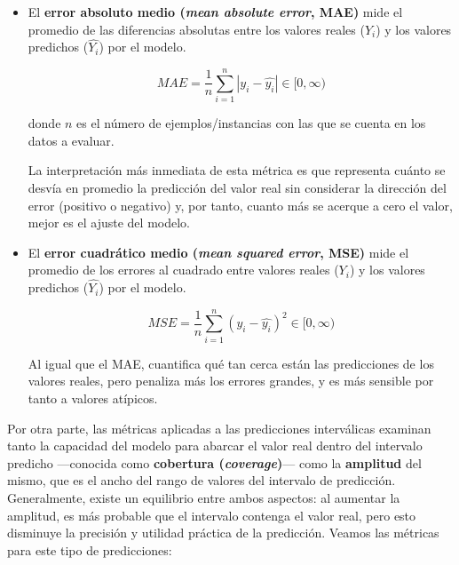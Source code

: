 \begin{itemize}
    \item El \textbf{error absoluto medio (\textit{mean absolute error}, MAE)} mide el promedio de las 
    diferencias absolutas entre los valores reales ($Y_i$) y los valores predichos ($\hat{Y_i}$) por el 
    modelo.

    $$
    MAE = \frac{1}{n} \sum_{i=1}^n{|y_i - \hat{y_i}|} \in [0, \infty)
    $$

    donde $n$ es el número de ejemplos/instancias con las que se cuenta en los datos a evaluar.

    La interpretación más inmediata de esta métrica es que representa cuánto se desvía en promedio la 
    predicción del valor real sin considerar la dirección del error (positivo o negativo) y, por tanto, cuanto 
    más se acerque a cero el valor, mejor es el ajuste del modelo.

    \item El \textbf{error cuadrático medio (\textit{mean squared error}, MSE)} mide el promedio de los 
    errores al cuadrado entre valores reales ($Y_i$) y los valores predichos ($\hat{Y_i}$) por el modelo.
    
    $$
    MSE = \frac{1}{n} \sum_{i=1}^n{(y_i - \hat{y_i})^2} \in [0, \infty)
    $$

    Al igual que el MAE, cuantifica qué tan cerca están las predicciones de los valores reales, pero penaliza
    más los errores grandes, y es más sensible por tanto a valores atípicos.

\end{itemize}


Por otra parte, las métricas aplicadas a las predicciones interválicas examinan tanto la capacidad del modelo 
para abarcar el valor real dentro del intervalo predicho ---conocida como 
\textbf{cobertura (\textit{coverage})}--- como la \textbf{amplitud} del mismo, que es el ancho del rango de 
valores del intervalo de predicción. 
Generalmente, existe un equilibrio entre ambos aspectos: al aumentar la amplitud, es más probable que el 
intervalo contenga el valor real, pero esto disminuye la precisión y utilidad práctica de la predicción.
Veamos las métricas para este tipo de predicciones: 

